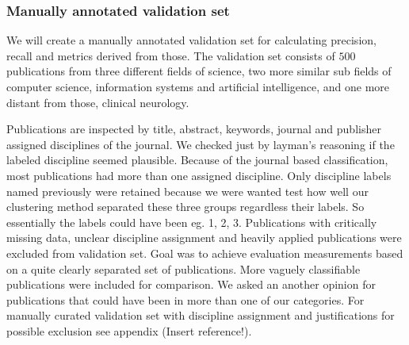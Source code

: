 \subsubsection{Manually annotated validation set}
We will create a manually annotated validation set for calculating
precision, recall and metrics derived from those.
The validation
set consists of $500$ publications from three different fields of
science, two more similar sub fields of computer science, 
information systems and artificial intelligence, and one more
distant from those, clinical neurology.

Publications are inspected by title, abstract, keywords, journal
and publisher assigned disciplines of the journal. We checked 
just by layman's reasoning if the labeled discipline seemed 
plausible. Because of the journal based 
classification, most publications had more than one 
assigned discipline. Only discipline labels named 
previously were retained because we were wanted test 
how well our clustering method separated these three 
groups regardless their labels. So essentially the 
labels could have been eg. 1, 2, 3. Publications
with critically missing data, unclear discipline assignment and
heavily applied publications were excluded from validation set.
Goal was to achieve evaluation measurements based on a quite 
clearly separated set of publications. More vaguely classifiable
publications were included for comparison. We asked an another 
opinion for publications that could have been in more 
than one of our categories. For manually curated validation set 
with discipline assignment and justifications for
possible exclusion see appendix (Insert reference!).

